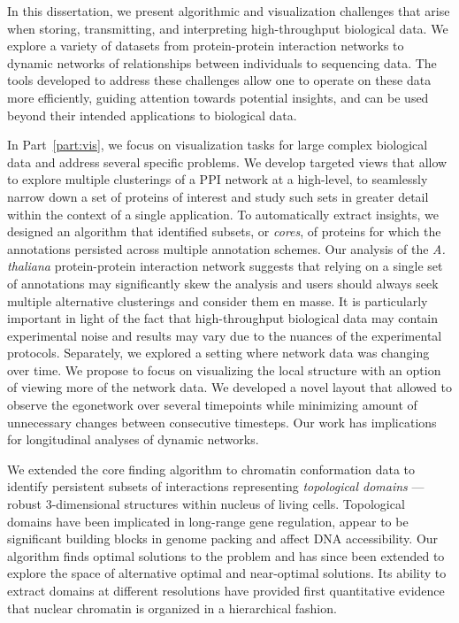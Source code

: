 \documentclass[12pt]{cmuthesis}
\begin{document}

In this dissertation, we present algorithmic and visualization challenges that arise when storing, transmitting, and interpreting high-throughput biological data. We explore a variety of datasets from protein-protein interaction networks to dynamic networks of relationships between individuals to sequencing data. The tools developed to address these challenges allow one to operate on these data more efficiently, guiding attention towards potential insights, and can be used beyond their intended applications to biological data.

In Part~\ref{part:vis}, we focus on visualization tasks for large complex biological data and address several specific problems. We develop targeted views that allow to explore multiple clusterings of a PPI network at a high-level, to seamlessly narrow down a set of proteins of interest and study such sets in greater detail within the context of a single application. To automatically extract insights, we designed an algorithm that identified subsets, or \textit{cores}, of proteins for which the annotations persisted across multiple annotation schemes. 
Our analysis of the \textit{A. thaliana} protein-protein interaction network suggests that relying on a single set of annotations may significantly skew the analysis and users should always seek multiple alternative clusterings and consider them en masse. It is particularly important in light of the fact that high-throughput biological data may contain experimental noise and results may vary due to the nuances of the experimental protocols.
Separately, we explored a setting where network data was changing over time. We propose to focus on visualizing the local structure with an option of viewing more of the network data. We developed a novel layout that allowed to observe the egonetwork over several timepoints while minimizing amount of unnecessary changes between consecutive timesteps. Our work has implications for longitudinal analyses of dynamic networks.

We extended the core finding algorithm to chromatin conformation data to identify persistent subsets of interactions representing \textit{topological domains} --- robust 3-dimensional structures within nucleus of living cells. Topological domains have been implicated in long-range gene regulation, appear to be significant building blocks in genome packing and affect DNA accessibility. Our algorithm finds optimal solutions to the problem and has since been extended to explore the space of alternative optimal and near-optimal solutions. Its ability to extract domains at different resolutions have provided first quantitative evidence that nuclear chromatin is organized in a hierarchical fashion.
\end{document}
